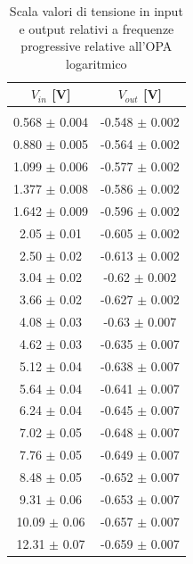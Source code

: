 \documentclass[journal]{IEEEtran}
\begin{document}
\begin{table}[H]
\centering
\begin{tabular}{c|c}
\multicolumn{1}{c|}{$V_{in}$ {[}V{]}} & \multicolumn{1}{c}{$V_{out}$ {[}V{]}} \\ \hline
\\
0.568 $\pm$ 0.004 & -0.548 $\pm$ 0.002  \\
0.880 $\pm$ 0.005 & -0.564 $\pm$ 0.002 \\ 
1.099 $\pm$ 0.006 & -0.577 $\pm$ 0.002 \\ 
1.377 $\pm$ 0.008 & -0.586 $\pm$ 0.002 \\ 
1.642 $\pm$ 0.009 & -0.596 $\pm$ 0.002 \\ 
2.05 $\pm$ 0.01 & -0.605 $\pm$ 0.002 \\ 
2.50 $\pm$ 0.02 & -0.613 $\pm$ 0.002 \\ 
3.04 $\pm$ 0.02 & -0.62 $\pm$ 0.002 \\ 
3.66 $\pm$ 0.02 & -0.627 $\pm$ 0.002 \\ 
4.08 $\pm$ 0.03 & -0.63 $\pm$ 0.007 \\ 
4.62 $\pm$ 0.03 & -0.635 $\pm$ 0.007 \\ 
5.12 $\pm$ 0.04 & -0.638 $\pm$ 0.007 \\ 
5.64 $\pm$ 0.04 & -0.641 $\pm$ 0.007 \\ 
6.24 $\pm$ 0.04 & -0.645 $\pm$ 0.007 \\ 
7.02 $\pm$ 0.05 & -0.648 $\pm$ 0.007 \\ 
7.76 $\pm$ 0.05 & -0.649 $\pm$ 0.007 \\ 
8.48 $\pm$ 0.05 & -0.652 $\pm$ 0.007 \\ 
9.31 $\pm$ 0.06 & -0.653 $\pm$ 0.007 \\ 
10.09 $\pm$ 0.06 & -0.657 $\pm$ 0.007 \\ 
12.31 $\pm$ 0.07 & -0.659 $\pm$ 0.007 \\ 
\end{tabular}
\vspace{5 mm}
\caption{Scala valori di tensione in input e output relativi a frequenze progressive relative all'OPA logaritmico}
\label{tab:opa-log}
\end{table}
\end{document}
